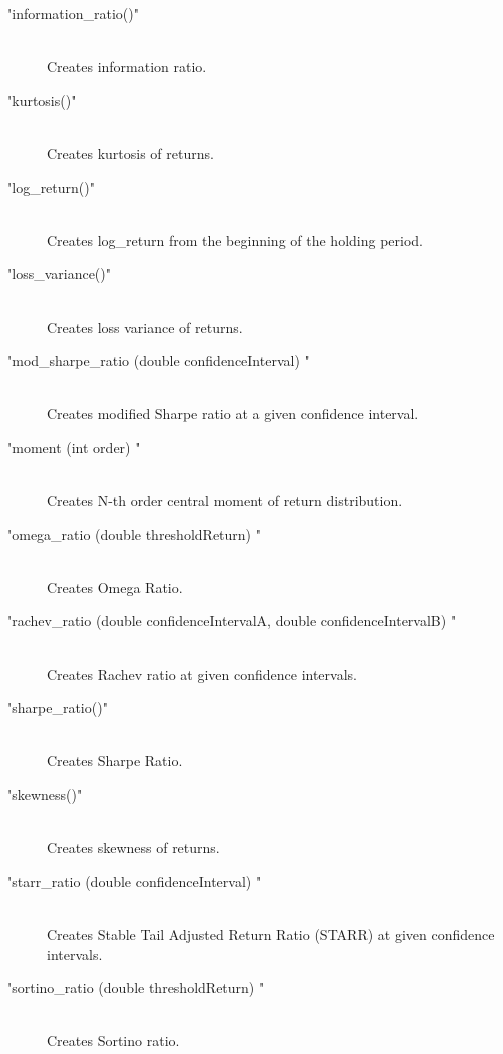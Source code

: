 \documentclass[letterpaper]{report}
\newcounter{N}
\begin{document}
\begin{description}
\item["information\_ratio()"] \hfill \\ 
Creates information ratio.




\item["kurtosis()"] \hfill \\ 
Creates kurtosis of returns.



\item["log\_return()"] \hfill \\ 
Creates log\_return from the beginning of the holding period.

\item["loss\_variance()"] \hfill \\ 
Creates loss variance of returns.


\item["mod\_sharpe\_ratio (double confidenceInterval) "] \hfill \\ 
Creates modified Sharpe ratio  at a given confidence
 interval.

\item["moment (int order) "] \hfill \\ 
Creates N-th order central moment of  return distribution.


\item["omega\_ratio (double thresholdReturn) "] \hfill \\ 
Creates Omega Ratio.

\item["rachev\_ratio (double confidenceIntervalA,
 double confidenceIntervalB) "] \hfill \\ 
Creates Rachev ratio  at given confidence intervals.


\item["sharpe\_ratio()"] \hfill \\ 
Creates Sharpe Ratio.

\item["skewness()"] \hfill \\ 
Creates skewness of  returns.

\item["starr\_ratio (double confidenceInterval) "] \hfill \\ 
Creates Stable Tail Adjusted Return Ratio (STARR)  
at given confidence intervals.
		
\item["sortino\_ratio (double thresholdReturn) "] \hfill \\ 
Creates Sortino ratio.
	

\end{description}
\end{document}
